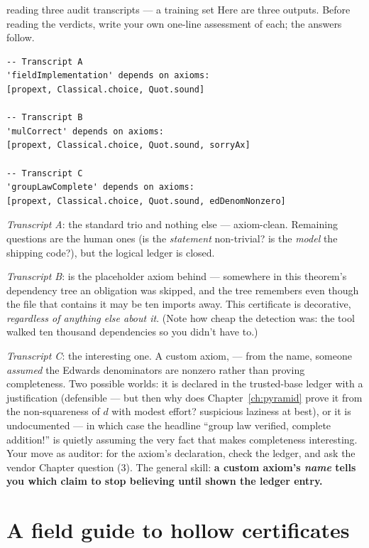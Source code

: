 \begin{worked}{reading three audit transcripts --- a training set}
Here are three  outputs. Before reading the
verdicts, write your own one-line assessment of each; the answers
follow.

\begin{lstlisting}
-- Transcript A
'fieldImplementation' depends on axioms:
[propext, Classical.choice, Quot.sound]

-- Transcript B
'mulCorrect' depends on axioms:
[propext, Classical.choice, Quot.sound, sorryAx]

-- Transcript C
'groupLawComplete' depends on axioms:
[propext, Classical.choice, Quot.sound, edDenomNonzero]
\end{lstlisting}

\emph{Transcript A}: the standard trio and nothing else --- axiom-clean.
Remaining questions are the human ones (is the \emph{statement}
non-trivial? is the \emph{model} the shipping code?), but the logical
ledger is closed.

\emph{Transcript B}:  is the placeholder axiom behind
 --- somewhere in this theorem's dependency tree an
obligation was skipped, and the tree remembers even though the file that
contains it may be ten imports away. This certificate is decorative,
\emph{regardless of anything else about it}. (Note how cheap the
detection was: the tool walked ten thousand dependencies so you didn't
have to.)

\emph{Transcript C}: the interesting one. A custom axiom,
 --- from the name, someone \emph{assumed} the
Edwards denominators are nonzero rather than proving completeness. Two
possible worlds: it is declared in the trusted-base ledger with a
justification (defensible --- but then why does
Chapter~\ref{ch:pyramid} prove it from the non-squareness of $d$ with
modest effort? suspicious laziness at best), or it is undocumented ---
in which case the headline ``group law verified, complete addition!''
is quietly assuming the very fact that makes completeness interesting.
Your move as auditor:  for the axiom's declaration, check
the ledger, and ask the vendor Chapter question (3). The general
skill: \textbf{a custom axiom's \emph{name} tells you which claim to
stop believing until shown the ledger entry.}
\end{worked}

\section{A field guide to hollow certificates}


